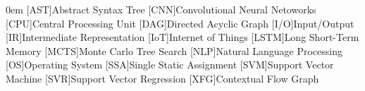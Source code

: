 \begin{acronym}[LSTM]\itemsep0em
    [AST]{Abstract Syntax Tree}
    [CNN]{Convolutional Neural Netoworks}
    [CPU]{Central Processing Unit}
    [DAG]{Directed Acyclic Graph}
    [I/O]{Input/Output}
    [IR]{Intermediate Representation}
    [IoT]{Internet of Things}
    [LSTM]{Long Short-Term Memory}
    [MCTS]{Monte Carlo Tree Search}
    [NLP]{Natural Language Processing}
    [OS]{Operating System}
    [SSA]{Single Static Assignment}
    [SVM]{Support Vector Machine}
    [SVR]{Support Vector Regression}
    [XFG]{Contextual Flow Graph}
\end{acronym}
